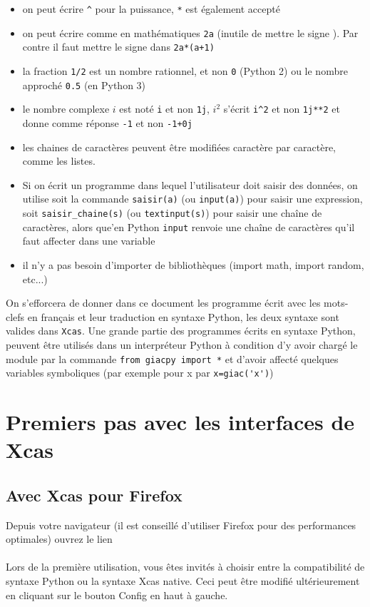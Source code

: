 \documentclass[12pt,a4paper]{book}
\begin{document}
\begin{giacjshere}
\begin{itemize}
\item on peut \'ecrire {\tt \verb|^|} pour la puissance, 
{\tt **} est \'egalement accept\'e
\item on peut \'ecrire comme en math\'ematiques {\tt 2a} (inutile de mettre 
le signe {\tt *}). Par contre il faut mettre le signe {\tt *}
dans {\tt 2a*(a+1)}
\item la fraction {\tt 1/2} est un nombre rationnel,
et non {\tt 0} (Python 2) ou le nombre approch\'e {\tt 0.5} (en Python 3)
\item le nombre complexe $i$ est not\'e {\tt i} 
et non {\tt 1j}, $i^2$ s'\'ecrit 
{\tt i\verb|^|2} et non {\tt 1j**2} et donne comme r\'eponse {\tt -1} et non 
{\tt -1+0j} 
\item les chaines de caract\`eres peuvent \^etre modifi\'ees caract\`ere
par caract\`ere, comme les listes.
\item Si on \'ecrit un programme dans lequel l'utilisateur doit saisir des 
donn\'ees, on utilise soit la commande {\tt saisir(a)} (ou {\tt input(a)}) pour 
saisir une expression, soit {\tt saisir\_chaine(s)} (ou {\tt textinput(s)}) 
pour saisir une cha\^{i}ne de caract\`eres, alors que'en Python {\tt input}
renvoie une cha\^{i}ne de caract\`eres qu'il faut affecter dans une variable
\item il n'y a pas besoin d'importer de biblioth\`eques  
(import math, import random, etc...)\\
\end{itemize}
On s'efforcera de donner dans ce document 
les programme \'ecrit avec les mots-clefs en fran\c{c}ais et leur 
traduction en syntaxe Python,
les deux syntaxe sont valides dans
{\tt Xcas}. Une grande partie des programmes \'ecrits en syntaxe Python,
peuvent \^etre utilis\'es dans un interpr\'eteur Python \`a condition
d'y avoir charg\'e le module 
par la commande \verb|from giacpy import *|  et d'avoir
affect\'e quelques variables symboliques (par exemple
pour x par \verb|x=giac('x')|)

\section{Premiers pas avec les interfaces de Xcas}
\subsection{Avec Xcas pour Firefox}
Depuis votre navigateur (il est conseill\'e 
d'utiliser Firefox pour des performances
optimales) ouvrez le lien\\
\\
Lors de la premi\`ere utilisation, vous \^etes invit\'es \`a choisir
entre la compatibilit\'e de syntaxe Python ou la syntaxe Xcas native.
Ceci peut \^etre modifi\'e ult\'erieurement en cliquant sur le bouton
Config en haut \`a gauche.


\end{giacjshere}
\end{document}
